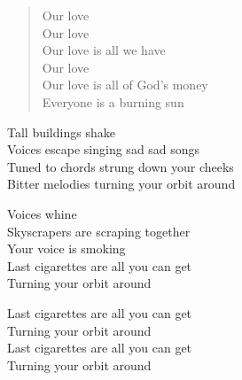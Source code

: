 \begin{song}
\begin{verse}
Our love \\
Our love \\
Our love is all we have \\
Our love \\
Our love is all of God's money \\
Everyone is a burning sun
\end{verse}

\begin{chorus}
Tall buildings shake \\
Voices escape singing sad sad songs \\
Tuned to chords strung down your cheeks \\
Bitter melodies turning your orbit around
\end{chorus}

\begin{bridge}
Voices whine \\
Skyscrapers are scraping together \\
Your voice is smoking \\
Last cigarettes are all you can get \\
Turning your orbit around
\end{bridge}

\begin{outro}
Last cigarettes are all you can get \\
Turning your orbit around \\
Last cigarettes are all you can get \\
Turning your orbit around
\end{outro}



\end{song}